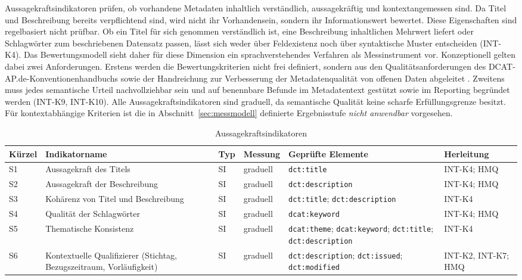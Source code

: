 Aussagekraftsindikatoren prüfen, ob vorhandene Metadaten inhaltlich verständlich, aussagekräftig und kontextangemessen sind. Da Titel und Beschreibung bereits verpflichtend sind, wird nicht ihr Vorhandensein, sondern ihr Informationswert bewertet. Diese Eigenschaften sind regelbasiert nicht prüfbar. Ob ein Titel für sich genommen verständlich ist, eine Beschreibung inhaltlichen Mehrwert liefert oder Schlagwörter zum beschriebenen Datensatz passen, lässt sich weder über Feldexistenz noch über syntaktische Muster entscheiden (INT-K4). Das Bewertungsmodell sieht daher für diese Dimension ein sprachverstehendes Verfahren als Messinstrument vor. Konzeptionell gelten dabei zwei Anforderungen. Erstens werden die Bewertungskriterien nicht frei definiert, sondern aus den Qualitätsanforderungen des DCAT-AP.de-Konventionenhandbuchs sowie der Handreichung zur Verbesserung der Metadatenqualität von offenen Daten abgeleitet \cite{DCATAPDEImplRules2, bydata2025handreichung}. Zweitens muss jedes semantische Urteil nachvollziehbar sein und auf benennbare Befunde im Metadatentext gestützt sowie im Reporting begründet werden (INT-K9, INT-K10). Alle Aussagekraftsindikatoren sind graduell, da semantische Qualität keine scharfe Erfüllungsgrenze besitzt. Für kontextabhängige Kriterien ist die in Abschnitt~\ref{sec:messmodell} definierte Ergebnisstufe \textit{nicht anwendbar} vorgesehen.

\begin{table}[H]
\centering
\scriptsize
\renewcommand{\arraystretch}{1.2}
\begin{tabular}{p{} p{} p{} p{} p{} >{\raggedright\arraybackslash}p{}}
    \hline
    \textbf{Kürzel} & \textbf{Indikatorname} & \textbf{Typ} & \textbf{Messung} & \textbf{Geprüfte Elemente} & \textbf{Herleitung} \\
    \hline
    S1 & Aussagekraft des Titels & SI & graduell & \texttt{dct:title} & INT-K4; HMQ \\
    \hline
    S2 & Aussagekraft der Beschreibung & SI & graduell & \texttt{dct:description} & INT-K4; HMQ \\
    \hline
    S3 & Kohärenz von Titel und Beschreibung & SI & graduell & \texttt{dct:title}; \texttt{dct:description} & INT-K4 \\
    \hline
    S4 & Qualität der Schlagwörter & SI & graduell & \texttt{dcat:keyword} & INT-K4; HMQ \\
    \hline
    S5 & Thematische Konsistenz & SI & graduell & \texttt{dcat:theme}; \texttt{dcat:keyword}; \texttt{dct:title}; \texttt{dct:description} & INT-K4 \\
    \hline
    S6 & Kontextuelle Qualifizierer (Stichtag, Bezugszeitraum, Vorläufigkeit) & SI & graduell & \texttt{dct:description}; \texttt{dct:issued}; \texttt{dct:modified} & INT-K2, INT-K7; HMQ \\
    \hline
\end{tabular}
\caption{Aussagekraftsindikatoren}
\label{tab:aussagekraftsindikatoren}
\end{table}

